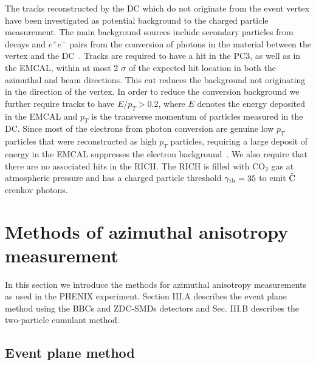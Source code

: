 \documentclass[aps,prc,superscriptaddress,showpacs,floatfix,twocolumn]{revtex4}
\newcommand \pt{\mbox{$p_T$}\xspace}
\begin{document}
The tracks reconstructed by the DC which do not originate from 
the event vertex have been investigated as potential background 
to the charged particle measurement. The main background sources 
include secondary particles from decays and $e^{+}e^{-}$ pairs 
from the conversion of photons in the material between the 
vertex and the DC~\cite{Adler:2003au}. Tracks are required to 
have a hit in the PC3, as well as in the EMCAL, within at most 2 
$\sigma$ of the expected hit location in both the azimuthal and 
beam directions. This cut reduces the background not originating 
in the direction of the vertex. In order to reduce the 
conversion background we further require tracks to have $E/\pt > 
0.2$, where $E$ denotes the energy deposited in the EMCAL and 
\pt is the transverse momentum of particles measured in the DC. 
Since most of the electrons from photon conversion are genuine 
low \pt particles that were reconstructed as high \pt particles, 
requiring a large deposit of energy in the EMCAL suppresses the 
electron background~\cite{Adler:2005ad}. We also require that 
there are no associated hits in the RICH. The RICH is filled 
with CO$_2$ gas at atmospheric pressure and has a charged 
particle threshold $\gamma_{\rm{th}}=35$ to emit 
$\check{\rm C}$erenkov photons.

\section{Methods of azimuthal anisotropy measurement\label{sec:methods}}

In this section we introduce the methods for azimuthal anisotropy measurements as used in 
the PHENIX experiment. Section III.A describes the event plane method using the BBCs and ZDC-SMDs 
detectors and Sec. III.B describes the two-particle cumulant method.

\subsection{Event plane method \label{subsec:eventplanemethod}}
\end{document}
